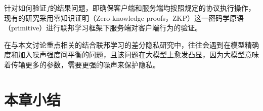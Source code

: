 针对如何验证$f$的结果问题，即确保客户端和服务端均按照规定的协议执行操作，现有的研究采用零知识证明（Zero-knowledge proofs，ZKP）\cite{goldwasser2019knowledge, parno2016pinocchio}这一密码学原语（primitive）进行联邦学习框架下服务端对客户端行为的验证。

在与本文讨论重点相关的结合联邦学习的差分隐私研究中，往往会遇到在模型精确度和加入噪声强度间平衡的问题，且该问题在大模型上愈发凸显，因为大模型意味着传输更多的参数，需要更强的噪声来保护隐私\cite{mcmahan2017learning}。

\section{本章小结}

